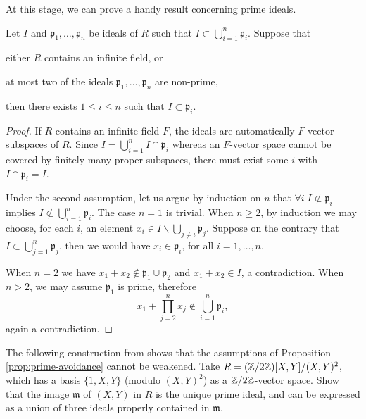 At this stage, we can prove a handy result concerning prime ideals.
\begin{proposition}\label{prop:prime-avoidance} 
	Let $I$ and $\mathfrak{p}_1, \ldots, \mathfrak{p}_n$ be ideals of $R$ such that $I \subset \bigcup_{i=1}^n \mathfrak{p}_i$. Suppose that
	\begin{compactitem}
		\item either $R$ contains an infinite field, or
		\item at most two of the ideals $\mathfrak{p}_1, \ldots, \mathfrak{p}_n$ are non-prime,
	\end{compactitem}
	then there exists $1 \leq i \leq n$ such that $I \subset \mathfrak{p}_i$.
\end{proposition}
\begin{proof}
	If $R$ contains an infinite field $F$, the ideals are automatically $F$-vector subspaces of $R$. Since $I = \bigcup_{i=1}^n I \cap \mathfrak{p}_i$ whereas an $F$-vector space cannot be covered by finitely many proper subspaces, there must exist some $i$ with $I \cap \mathfrak{p}_i = I$.

	Under the second assumption, let us argue by induction on $n$ that $\forall i \; I \not\subset \mathfrak{p}_i$ implies $I \not\subset \bigcup_{i=1}^n \mathfrak{p}_i$. The case $n=1$ is trivial. When $n \geq 2$, by induction we may choose, for each $i$, an element $x_i \in I \smallsetminus \bigcup_{j \neq i} \mathfrak{p}_j$. Suppose on the contrary that $I \subset \bigcup_{j=1}^n \mathfrak{p}_j$, then we would have $x_i \in \mathfrak{p}_i$, for all $i=1, \ldots, n$.

	When $n=2$ we have $x_1 + x_2 \notin \mathfrak{p}_1 \cup \mathfrak{p}_2$ and $x_1 + x_2 \in I$, a contradiction. When $n > 2$, we may assume $\mathfrak{p}_1$ is prime, therefore
	\[ x_1 + \prod_{j=2}^n x_j \notin \bigcup_{i=1}^n \mathfrak{p}_i, \]
	again a contradiction.
\end{proof}

\begin{exercise}
	The following construction from \cite[Exercise 3.17]{Eis95} shows that the assumptions of Proposition \ref{prop:prime-avoidance} cannot be weakened. Take $R = (\mathbb{Z}/2\mathbb{Z})[X, Y] / (X,Y)^2$, which has a basis $\{1, X, Y\}$ (modulo $(X,Y)^2$) as a $\mathbb{Z}/2\mathbb{Z}$-vector space. Show that the image $\mathfrak{m}$ of $(X, Y)$ in $R$ is the unique prime ideal, and can be expressed as a union of three ideals properly contained in $\mathfrak{m}$.
\end{exercise}

